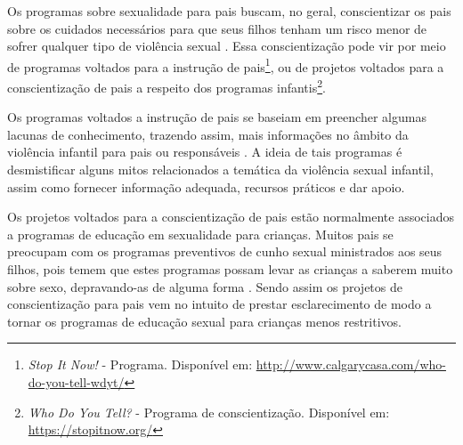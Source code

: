 
Os programas sobre sexualidade para pais buscam, no geral, conscientizar os pais sobre os cuidados necessários para que seus filhos tenham um risco menor de sofrer qualquer tipo de violência sexual \cite{pelisoli2010prevenccao}. Essa conscientização pode vir por meio de programas voltados para a instrução de pais\footnote{\textit{\label{note:nota2}Stop It Now!} - Programa. Disponível em: \url{http://www.calgarycasa.com/who-do-you-tell-wdyt/}}, ou de projetos voltados para a conscientização de pais a respeito dos programas infantis\footnote{\textit{\label{note:nota3}Who Do You Tell?} - Programa de conscientização. Disponível em: \url{https://stopitnow.org/}}. 

Os programas voltados a instrução de pais se baseiam em preencher algumas lacunas de conhecimento, trazendo assim, mais informações no âmbito da violência infantil para pais ou responsáveis \cite{maria2010papel}. A ideia de tais programas é desmistificar alguns mitos relacionados a temática da violência sexual infantil, assim como fornecer informação adequada, recursos práticos e dar apoio.

Os projetos voltados para a conscientização de pais estão normalmente associados a programas de educação em sexualidade para crianças. Muitos pais se preocupam com os programas preventivos de cunho sexual ministrados aos seus filhos, pois temem que estes programas possam levar as crianças a saberem muito sobre sexo, depravando-as de alguma forma \cite{chen2007prevention}. Sendo assim os projetos de conscientização para pais vem no intuito de prestar esclarecimento de modo a tornar os programas de educação sexual para crianças menos restritivos. 

